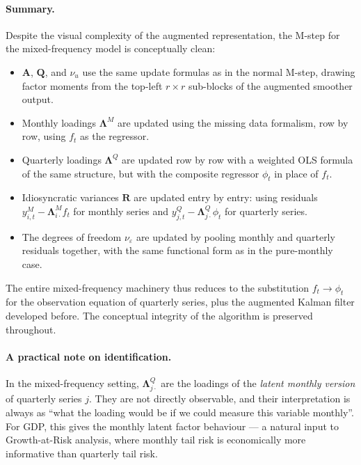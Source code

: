 \documentclass[11pt, a4paper, oneside]{article}
\newcommand{\mL}{\boldsymbol{\Lambda}}
\newcommand{\mA}{\mathbf{A}}
\newcommand{\mR}{\mathbf{R}}
\newcommand{\mQ}{\mathbf{Q}}
\begin{document}
\paragraph{Summary.}
Despite the visual complexity of the augmented representation, the
M-step for the mixed-frequency model is conceptually clean:
\begin{itemize}[leftmargin=1.5em, itemsep=3pt]
    \item $\mA$, $\mQ$, and $\nu_u$ use the same update formulas as in
          the normal M-step, drawing factor moments from the
          top-left $r \times r$ sub-blocks of the augmented smoother
          output.
    \item Monthly loadings $\mL^M$ are updated using the missing data formalism,
          row by row, using $f_t$ as
          the regressor.
    \item Quarterly loadings $\mL^Q$ are updated row by row with a
          weighted OLS formula of the same structure, but with the
          composite regressor $\phi_t$ in place of $f_t$.
    \item Idiosyncratic variances $\mR$ are updated entry by entry:
          using residuals $y^M_{i,t} - \mL^M_{i\cdot} f_t$ for monthly
          series and $y^Q_{j,t} - \mL^Q_{j\cdot} \phi_t$ for quarterly
          series.
    \item The degrees of freedom $\nu_\varepsilon$ are updated by
          pooling monthly and quarterly residuals together, with the
          same functional form as in the pure-monthly case.
\end{itemize}
The entire mixed-frequency machinery thus reduces to the substitution
$f_t \to \phi_t$ for the observation equation of quarterly series,
plus the augmented Kalman filter developed before. The conceptual integrity of the
algorithm is preserved throughout.

\paragraph{A practical note on identification.}
In the mixed-frequency setting, $\mL^Q_{j\cdot}$ are the loadings of
the \emph{latent monthly version} of quarterly series $j$. They are
not directly observable, and their interpretation is always as
``what the loading would be if we could measure this variable
monthly''. For GDP, this gives the monthly latent factor behaviour —
a natural input to Growth-at-Risk analysis, where monthly tail risk
is economically more informative than quarterly tail risk.
\end{document}
